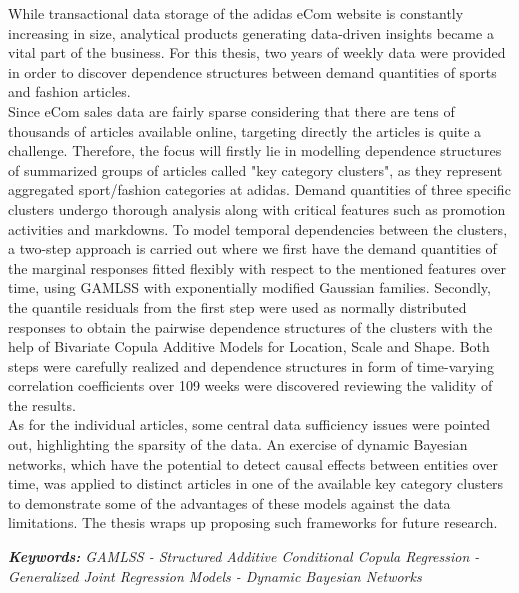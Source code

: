 

\vspace{2cm}


While transactional data storage of the adidas eCom website is constantly increasing in size, analytical products generating data-driven insights became a vital part of the business. For this thesis, two years of weekly data were provided in order to discover dependence structures between demand quantities of sports and fashion articles.
\\

Since eCom sales data are fairly sparse considering that there are tens of thousands of articles available online, targeting directly the articles is quite a challenge. Therefore, the focus will firstly lie in modelling dependence structures of summarized groups of articles called "key category clusters", as they represent aggregated sport/fashion categories at adidas. Demand quantities of three specific clusters undergo thorough analysis along with critical features such as promotion activities and markdowns. To model temporal dependencies between the clusters, a two-step approach is carried out where we first have the demand quantities of the marginal responses fitted flexibly with respect to the mentioned features over time, using GAMLSS with exponentially modified Gaussian families. Secondly, the quantile residuals from the first step were used as normally distributed responses to obtain the pairwise dependence structures of the clusters with the help of Bivariate Copula Additive Models for Location, Scale and Shape. Both steps were carefully realized and dependence structures in form of time-varying correlation coefficients over 109 weeks were discovered reviewing the validity of the results.
\\

As for the individual articles, some central data sufficiency issues were pointed out, highlighting the sparsity of the data. An exercise of dynamic Bayesian networks, which have the potential to detect causal effects between entities over time, was applied to distinct articles in one of the available key category clusters to demonstrate some of the advantages of these models against the data limitations. The thesis wraps up proposing such frameworks for future research.


\vspace{1cm}

\textit{\textbf{Keywords:} GAMLSS - Structured Additive Conditional Copula Regression - Generalized Joint Regression Models - Dynamic Bayesian Networks}


